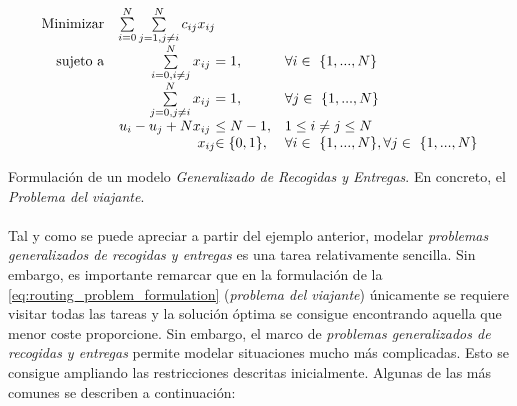 \documentclass{subfiles}
\begin{document}
        \begin{eqfloat}
          \begin{equation}
            \begin{array}{rr@{}ll}
              \text{Minimizar} & \sum\limits_{i = 0}^{N}\sum\limits_{j = 1, j \neq i}^{N} c_{ij}x_{ij} & & \\
              \text{sujeto a}	 & \sum\limits_{i = 0, i \neq j}^{N} x_{ij} \ &= 1, & \forall i \in \{1,...,N\} \\
                               & \sum\limits_{j = 0, j \neq i}^{N} x_{ij} \ &= 1, & \forall j \in \{1,...,N\} \\
                               & u_{i} - u_{j} + Nx_{ij} \ &\leq N - 1, & 1 \leq i \neq j \leq N \\
                               &                             	x_{ij} 	&\in \{0, 1\}, 	                 & \forall i \in \{1,...,N\},\forall j \in \{1,...,N\}
            \end{array}
          \end{equation}
          \caption{Formulación de un modelo \emph{Generalizado de Recogidas y Entregas}. En concreto, el \emph{Problema del viajante}.}
          \label{eq:routing_problem_formulation}
        \end{eqfloat}

        \paragraph{}
        Tal y como se puede apreciar a partir del ejemplo anterior, modelar \emph{problemas generalizados de recogidas y entregas} es una tarea relativamente sencilla. Sin embargo, es importante remarcar que en la formulación de la \cref{eq:routing_problem_formulation} (\emph{problema del viajante}) únicamente se requiere visitar todas las tareas y la solución óptima se consigue encontrando aquella que menor coste proporcione. Sin embargo, el marco de \emph{problemas generalizados de recogidas y entregas} permite modelar situaciones mucho más complicadas. Esto se consigue ampliando las restricciones descritas inicialmente. Algunas de las más comunes se describen a continuación:
\end{document}

